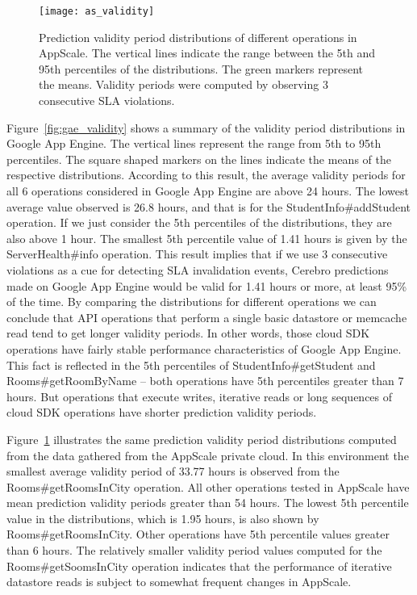 \begin{figure}
\centering
\texttt{[image: as\_validity]}
\caption{Prediction validity period distributions of different operations in AppScale. The vertical lines indicate the range between the 5th and 95th percentiles of the distributions. The green markers represent the means. Validity periods were computed by observing 3 consecutive SLA
violations.}
\label{fig:as_validity}
\end{figure}

Figure~\ref{fig:gae_validity} shows a summary of the validity period distributions in Google App Engine. The
vertical lines represent the range from 5th to 95th percentiles. The square shaped markers on the lines indicate the means of the
respective distributions. According to this result, the average validity periods for all 6 operations considered in Google App Engine are
above 24 hours. The lowest average value observed is 26.8 hours, and that is for the StudentInfo\#addStudent operation. If we
just consider the 5th percentiles of the distributions, they are also above 1 hour. The smallest 5th percentile value of 1.41 hours is 
given by the ServerHealth\#info operation. This result implies that if we use 3 consecutive violations as a cue for detecting SLA
invalidation events, Cerebro predictions made on Google App Engine would be valid for 1.41 hours or more, at least 95\% of the time.
By comparing the distributions for different operations we can conclude that API operations that perform a single basic datastore or
memcache read tend to get longer validity periods. In other words, those cloud SDK operations have fairly stable performance
characteristics of Google App Engine. This fact is reflected in the 5th percentiles of StudentInfo\#getStudent and
Rooms\#getRoomByName -- both operations have 5th percentiles greater than 7 hours. But operations that execute writes, iterative
reads or long sequences of cloud SDK operations have shorter prediction validity periods.

Figure~\ref{fig:as_validity} illustrates the same prediction validity period distributions computed from the data gathered from
the AppScale private cloud. In this environment the smallest average validity period of 33.77 hours is observed from the
Rooms\#getRoomsInCity operation. All other operations tested in AppScale have mean prediction validity periods greater
than 54 hours. The lowest 5th percentile value in the distributions, which is 1.95 hours, is also shown by Rooms\#getRoomsInCity.
Other operations have 5th percentile values greater than 6 hours. The relatively smaller validity period values computed for the
Rooms\#getSoomsInCity operation indicates that the performance of iterative datastore reads is subject to somewhat frequent changes 
in AppScale.

